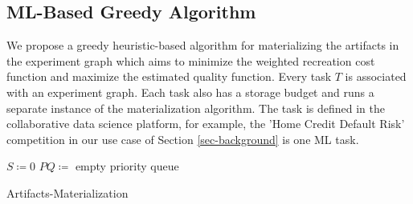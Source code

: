 \subsection{ML-Based Greedy Algorithm}\label{subsec-ml-based-materialization}
We propose a greedy heuristic-based algorithm for materializing the artifacts in the experiment graph which aims to minimize the weighted recreation cost function and maximize the estimated quality function.
Every task $T$ is associated with an experiment graph.
Each task also has a storage budget and runs a separate instance of the materialization algorithm.
The task is defined in the collaborative data science platform, for example, the 'Home Credit Default Risk' competition in our use case of Section \ref{sec-background} is one ML task.

\begin{algorithm}[h]
$S \coloneqq 0$
 {
}
$PQ \coloneqq $ empty priority queue\;

\caption{Artifacts-Materialization}\label{algorithm-materialization}
\end{algorithm}

